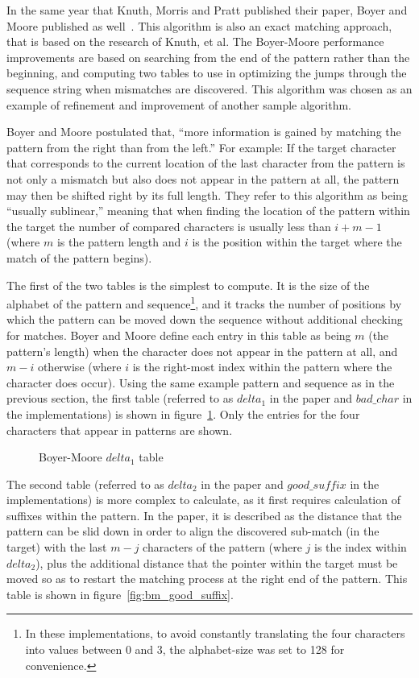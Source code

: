 In the same year that Knuth, Morris and Pratt published their paper, Boyer and Moore published as well~\cite{boyer}. This algorithm is also an exact matching approach, that is based on the research of Knuth, et al. The Boyer-Moore performance improvements are based on searching from the end of the pattern rather than the beginning, and computing two tables to use in optimizing the jumps through the sequence string when mismatches are discovered. This algorithm was chosen as an example of refinement and improvement of another sample algorithm.

Boyer and Moore postulated that, ``more information is gained by matching the pattern from the right than from the left.'' For example: If the target character that corresponds to the current location of the last character from the pattern is not only a mismatch but also does not appear in the pattern at all, the pattern may then be shifted right by its full length. They refer to this algorithm as being ``usually sublinear,'' meaning that when finding the location of the pattern within the target the number of compared characters is usually less than $i+m-1$ (where $m$ is the pattern length and $i$ is the position within the target where the match of the pattern begins).

The first of the two tables is the simplest to compute. It is the size of the alphabet of the pattern and sequence\footnote{In these implementations, to avoid constantly translating the four characters into values between 0 and 3, the alphabet-size was set to 128 for convenience.}, and it tracks the number of positions by which the pattern can be moved down the sequence without additional checking for matches. Boyer and Moore define each entry in this table as being $m$ (the pattern's length) when the character does not appear in the pattern at all, and $m - i$ otherwise (where $i$ is the right-most index within the pattern where the character does occur). Using the same example pattern and sequence as in the previous section, the first table (referred to as $delta_1$ in the paper and $bad\_char$ in the implementations) is shown in figure~\ref{fig:bm_bad_char}. Only the entries for the four characters that appear in patterns are shown.

\begin{figure}[ht]
\centering

\caption{Boyer-Moore $delta_1$ table}
\label{fig:bm_bad_char}
\end{figure}

The second table (referred to as $delta_2$ in the paper and $good\_suffix$ in the implementations) is more complex to calculate, as it first requires calculation of suffixes within the pattern. In the paper, it is described as the distance that the pattern can be slid down in order to align the discovered sub-match (in the target) with the last $m - j$ characters of the pattern (where $j$ is the index within $delta_2$), plus the additional distance that the pointer within the target must be moved so as to restart the matching process at the right end of the pattern. This table is shown in figure~\ref{fig:bm_good_suffix}.

